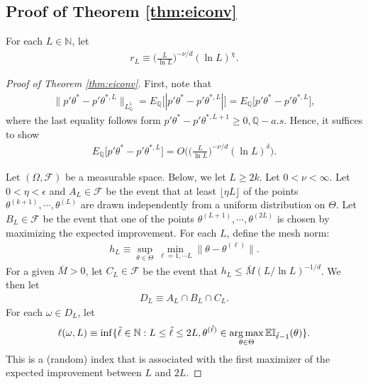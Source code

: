 \documentclass[letterpaper,11pt]{article}
\theoremstyle{myplain}
\theoremstyle{mydefinition}
\theoremstyle{myremark}
\def\argmax{\mathop{\rm arg\,max}}
\newcommand{\EI}{\mathbb{EI}}
\newcommand{\bQ}{\mathbb Q}
\numberwithin{equation}{section}
\numberwithin{figure}{section}
\begin{document}
\begin{appendix}
\subsection{Proof of Theorem \ref{thm:eiconv}}
For each $L\in\mathbb N$, let
\begin{align}
	r_L\equiv \Big(\frac{L}{\ln L}\Big)^{-\nu/d}( \ln L)^\chi.
\end{align}
\begin{proof}[Proof of Theorem \ref{thm:eiconv}]
	First, note that
\begin{align}
\|p'\theta^*-p'\theta^{*,L}\|_{L^1_{\mathbb Q}}=E_{\bQ}\big[\left|p'\theta^*-p'\theta^{*,L}\right|\big]	=	 E_{\bQ}\big[p'\theta^*-p'\theta^{*,L}\big],
\end{align}
where the last equality follows form $p'\theta^*-p'\theta^{*,L+1}\ge 0, \bQ-a.s.$ Hence, it suffices to show
\begin{align}
	E_{\bQ}\big[p'\theta^*-p'\theta^{*,L}\big]=O\Big(\Big(\frac{L}{\ln L}\Big)^{-\nu/d}( \ln L)^\delta\Big).
\end{align}

Let $(\Omega,\mathcal F)$ be a measurable space. Below, we let $L\ge 2k$.
Let $0<\nu<\infty$. Let $0<\eta<\epsilon$ and $A_L\in\mathcal F$ be the event that at least $\lfloor \eta L\rfloor$ of the points $\theta^{(k+1)},\cdots,\theta^{(L)}$ are drawn independently from a uniform distribution on $\Theta.$ Let $B_L\in\mathcal F$ be the event that one of the points $\theta^{(L+1)},\cdots,\theta^{(2L)}$ is chosen by maximizing the expected improvement. For each $L$, define the mesh norm:
\begin{align}
h_L\equiv \sup_{\theta\in\Theta}\min_{\ell=1,\cdots L}\|\theta-\theta^{(\ell)}\|.\label{eq:eiconv1}
\end{align}
For a given $\bar M>0$, let $C_L\in\mathcal F$ be the event that $h_L\le \bar M(L/\ln L)^{-1/d}$. We then let
\begin{align}
D_L\equiv A_L \cap B_L\cap C_L.	\label{eq:eiconv2}
\end{align}
For each $\omega\in D_L$, let
\begin{align}
\ell(\omega,L)\equiv\inf\{\tilde \ell\in\mathbb N:L\le\tilde\ell\le 2L,\theta^{(\tilde\ell)}\in\argmax_{\theta\in\Theta}\EI_{\tilde\ell-1}(\theta)\}.\label{eq:eiconv2a}
\end{align}
This is a (random) index that is associated with the first maximizer of the expected improvement between $L$ and $2L$.



\end{proof}
\end{appendix}
\end{document}
